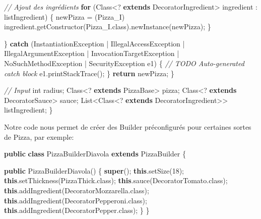\documentclass[french,]{article}
\newenvironment{Shaded}{}{}
\newcommand{\KeywordTok}[1]{\textcolor[rgb]{0.00,0.44,0.13}{\textbf{{#1}}}}
\newcommand{\DataTypeTok}[1]{\textcolor[rgb]{0.56,0.13,0.00}{{#1}}}
\newcommand{\DecValTok}[1]{\textcolor[rgb]{0.25,0.63,0.44}{{#1}}}
\newcommand{\CommentTok}[1]{\textcolor[rgb]{0.38,0.63,0.69}{\textit{{#1}}}}
\newcommand{\FunctionTok}[1]{\textcolor[rgb]{0.02,0.16,0.49}{{#1}}}
\newcommand{\NormalTok}[1]{{#1}}
\begin{document}
\begin{Shaded}
\begin{Highlighting}[]
            \CommentTok{// Ajout des ingrédients}
            \KeywordTok{for} \NormalTok{(Class<? }\KeywordTok{extends} \NormalTok{DecoratorIngredient> ingredient : listIngredient) \{}
                \NormalTok{newPizza = (Pizza_I) ingredient.}\FunctionTok{getConstructor}\NormalTok{(Pizza_I.}\FunctionTok{class}\NormalTok{).}\FunctionTok{newInstance}\NormalTok{(newPizza);}
            \NormalTok{\}}

        \NormalTok{\} }\KeywordTok{catch} \NormalTok{(InstantiationException | IllegalAccessException | IllegalArgumentException | InvocationTargetException}
                \NormalTok{| NoSuchMethodException | SecurityException e1) \{}
            \CommentTok{// TODO Auto-generated catch block}
            \NormalTok{e1.}\FunctionTok{printStackTrace}\NormalTok{();}
        \NormalTok{\}}
        \KeywordTok{return} \NormalTok{newPizza;}
    \NormalTok{\}}

    \CommentTok{// Input}
    \DataTypeTok{int} \NormalTok{radius;}
    \NormalTok{Class<? }\KeywordTok{extends} \NormalTok{PizzaBase> pizza;}
    \NormalTok{Class<? }\KeywordTok{extends} \NormalTok{DecoratorSauce> sauce;}
    \NormalTok{List<Class<? }\KeywordTok{extends} \NormalTok{DecoratorIngredient>> listIngredient;}
\NormalTok{\}}
\end{Highlighting}
\end{Shaded}

Notre code nous permet de créer des Builder préconfigurés pour certaines
sortes de Pizza, par exemple:

\begin{Shaded}
\begin{Highlighting}[]
\KeywordTok{public} \KeywordTok{class} \NormalTok{PizzaBuilderDiavola }\KeywordTok{extends} \NormalTok{PizzaBuilder \{}

    \KeywordTok{public} \FunctionTok{PizzaBuilderDiavola}\NormalTok{() \{}
        \KeywordTok{super}\NormalTok{();}
        \KeywordTok{this}\NormalTok{.}\FunctionTok{setSize}\NormalTok{(}\DecValTok{18}\NormalTok{);}
        \KeywordTok{this}\NormalTok{.}\FunctionTok{setThickness}\NormalTok{(PizzaThick.}\FunctionTok{class}\NormalTok{);}
        \KeywordTok{this}\NormalTok{.}\FunctionTok{sauce}\NormalTok{(DecoratorTomato.}\FunctionTok{class}\NormalTok{);}
        \KeywordTok{this}\NormalTok{.}\FunctionTok{addIngredient}\NormalTok{(DecoratorMozzarella.}\FunctionTok{class}\NormalTok{);}
        \KeywordTok{this}\NormalTok{.}\FunctionTok{addIngredient}\NormalTok{(DecoratorPepperoni.}\FunctionTok{class}\NormalTok{);}
        \KeywordTok{this}\NormalTok{.}\FunctionTok{addIngredient}\NormalTok{(DecoratorPepper.}\FunctionTok{class}\NormalTok{);}
    \NormalTok{\}}
\NormalTok{\}}
\end{Highlighting}
\end{Shaded}
\end{document}
